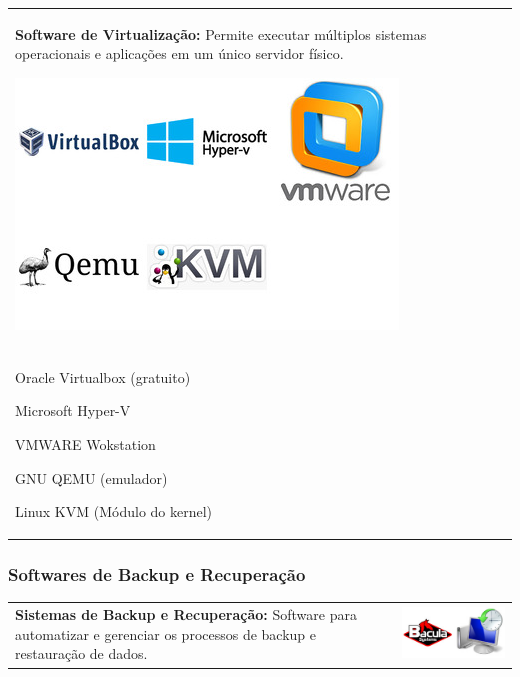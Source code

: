 \documentclass[
]{book}
\begin{document}
\begin{longtable}[]{@{}
  >{\centering\arraybackslash}p{}@{}}
\toprule\noalign{}
\endhead
\bottomrule\noalign{}
\endlastfoot
\textbf{Software de Virtualização:} Permite executar múltiplos sistemas operacionais e aplicações em um único servidor físico.

\includegraphics{images/InfraEstrutura/virtualização/virtualizacao.jpg} \\
Oracle Virtualbox (gratuito)

Microsoft Hyper-V

VMWARE Wokstation

GNU QEMU (emulador)

Linux KVM (Módulo do kernel) \\
\end{longtable}

\subsubsection{Softwares de Backup e Recuperação}\label{softwares-de-backup-e-recuperauxe7uxe3o}

\begin{longtable}[]{@{}
  >{\centering\arraybackslash}p{}
  >{\raggedright\arraybackslash}p{}@{}}
\toprule\noalign{}
\endhead
\bottomrule\noalign{}
\endlastfoot
\textbf{Sistemas de Backup e Recuperação:} Software para automatizar e gerenciar os processos de backup e restauração de dados. & \includegraphics{images/InfraEstrutura/backup/backup.jpg} \\
\end{longtable}
\end{document}
